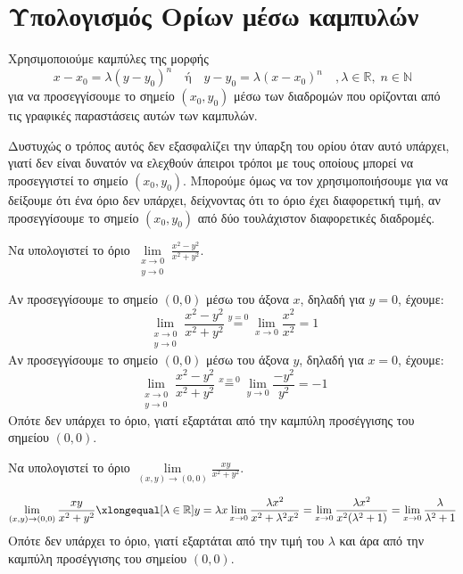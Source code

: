 \documentclass[a4paper,11pt]{report}
\begin{document}
  \section{Υπολογισμός Ορίων μέσω καμπυλών}

  Χρησιμοποιούμε καμπύλες της μορφής 
  \[ 
    \boxed{x - x_{0} = \lambda (y- y_{0})^{n}}
    \quad \text{ή} \quad 
    \boxed{y- y_{0} = \lambda (x- x_{0})^{n}} \quad ,\lambda \in \mathbb{R}, \; n \in 
    \mathbb{N}  
  \]
  για να προσεγγίσουμε το σημείο $ (x_{0}, y_{0}) $ μέσω των διαδρομών που ορίζονται από 
  τις γραφικές παραστάσεις αυτών των καμπυλών.

  \begin{rem}
    Δυστυχώς ο τρόπος αυτός δεν εξασφαλίζει την ύπαρξη του ορίου όταν αυτό υπάρχει, γιατί 
    δεν είναι δυνατόν να ελεχθούν άπειροι τρόποι με τους οποίους μπορεί να προσεγγιστεί το
    σημείο $ (x_{0}, y_{0}) $. Μπορούμε όμως να τον χρησιμοποιήσουμε για να δείξουμε ότι 
    ένα όριο δεν υπάρχει, δείχνοντας ότι το όριο έχει διαφορετική τιμή, αν προσεγγίσουμε το
    σημείο $ (x_{0}, y_{0}) $ από δύο τουλάχιστον διαφορετικές διαδρομές.
  \end{rem}

  \begin{example}
    Να υπολογιστεί το όριο $ \lim\limits_{\substack{x\to 0 \\y \to 0}} 
    \frac{x^{2}-y^{2}}{x^{2}+y^{2}} $.
    \begin{solution}
      Αν προσεγγίσουμε το σημείο $ (0,0) $ μέσω του άξονα $x$, δηλαδή για $ y=0 $, έχουμε:
      \[
        \lim\limits_{\substack{x\to 0 \\y \to 0}} \frac{x^{2}-y^{2}}{x^{2}+y^{2}} 
        \overset{y=0}{=} \lim_{x \to 0} \frac{x^{2}}{x^{2}} = 1
      \] 
      Αν προσεγγίσουμε το σημείο $ (0,0) $ μέσω του άξονα $y$, δηλαδή για $ x=0 $, έχουμε:
      \[
        \lim\limits_{\substack{x\to 0 \\y \to 0}} \frac{x^{2}-y^{2}}{x^{2}+y^{2}} 
        \overset{x=0}{=} \lim_{y \to 0} \frac{-y^{2}}{y^{2}} = -1
      \]
      Οπότε δεν υπάρχει το όριο, γιατί εξαρτάται από την καμπύλη προσέγγισης του σημείου 
      $ (0,0) $.
    \end{solution}
  \end{example}

  \begin{example}
    Να υπολογιστεί το όριο $ \lim\limits_{(x,y)\to (0, 0)} \frac{xy}{x^{2}+y^{2}} $.
    \begin{solution}
      \[
        \lim\limits_{(x,y)\to (0, 0)} \frac{xy}{x^{2}+y^{2}} 
        \xlongequal[\lambda \in \mathbb{R}]{y= \lambda x} \lim_{x \to 0}
        \frac{\lambda x^{2}}{x^{2}+ \lambda^{2} x^{2}} = \lim_{x \to 0} 
        \frac{\lambda x^{2}}{x^{2}(\lambda ^{2}+1)} = \lim_{x \to 0} 
        \frac{\lambda}{\lambda ^{2}+1} 
      \]
      Οπότε δεν υπάρχει το όριο, γιατί εξαρτάται από την τιμή του 
      $ \lambda $ και άρα από την καμπύλη προσέγγισης του σημείου 
      $ (0,0) $.
    \end{solution}
  \end{example}
\end{document}

